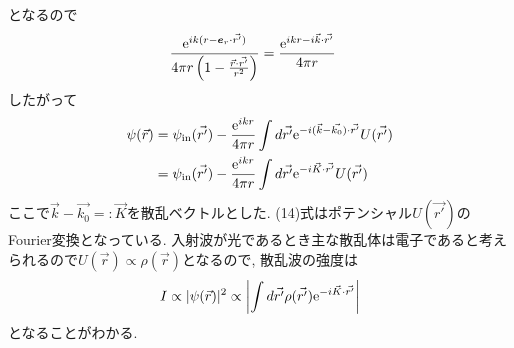 となるので
\begin{align}
  \begin{split}
    \frac{{\rm e}^{ik(r-\bm{e}_r\cdot\vec{r'})}}{4\pi r\left(1-\frac{\vec{r}\cdot\vec{r'}}{r^2}\right)}
    &=\frac{{\rm e}^{ikr-i\vec{k}\cdot\vec{r'}}}{4\pi r}
  \end{split}
\end{align}
したがって
\begin{align}
  \begin{split}
    \psi(\vec{r})&=\psi_{\rm in}(\vec{r'})-\frac{{\rm e}^{ikr}}{4\pi r}\int d\vec{r'}{\rm e}^{-i(\vec{k}-\vec{k_0})\cdot\vec{r'}}U(\vec{r'})\\
    &=\psi_{\rm in}(\vec{r'})-\frac{{\rm e}^{ikr}}{4\pi r}\int d\vec{r'}{\rm e}^{-i\vec{K}\cdot\vec{r'}}U(\vec{r'})\\
  \end{split}
\end{align}
ここで$\vec{k}-\vec{k_0}=:\vec{K}$を散乱ベクトルとした.
(14)式はポテンシャル$U(\vec{r'})$のFourier変換となっている.
入射波が光であるとき主な散乱体は電子であると考えられるので$U(\vec{r})\propto \rho(\vec{r})$となるので,
散乱波の強度は
\begin{align}
  I\propto|\psi(\vec{r})|^2\propto \left|\int d\vec{r'}\rho(\vec{r'}){\rm e}^{-i\vec{K}\cdot\vec{r'}}\right|
\end{align}
となることがわかる.